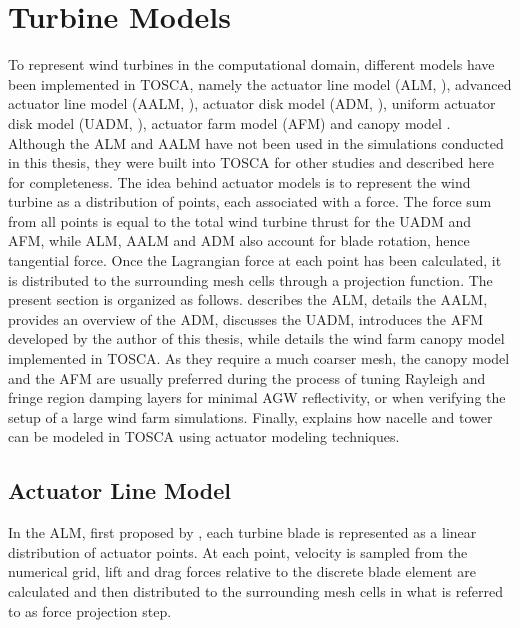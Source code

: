 \section{Turbine Models}
\label{sec:turbineModels}
To represent wind turbines in the computational domain, different models have been implemented in TOSCA, namely the actuator line model (ALM, \citealp{SorensenShen2002,Sorensen2015}), advanced actuator line model (\acrshort{AALM}, \citealp{ChurchfieldEtAl2017}), actuator disk model (\acrshort{ADM}, \citealp{MartinezTossasEtAl2012}), uniform actuator disk model (\acrshort{UADM}, \citealp{PorteAgelEtAl2010,JimenezEtAl2007, JimenezEtAl2008}), actuator farm model (\acrshort{AFM}) and canopy model \citep{LanzilaoMeyers2022a}. Although the ALM and AALM have not been used in the simulations conducted in this thesis, they were built into TOSCA for other studies and described here for completeness. The idea behind actuator models is to represent the wind turbine as a distribution of points, each associated with a force. The force sum from all points is equal to the total wind turbine thrust for the UADM and AFM, while ALM, AALM and ADM also account for blade rotation, hence tangential force. Once the Lagrangian force at each point has been calculated, it is distributed to the surrounding mesh cells through a projection function. The present section is organized as follows.  describes the ALM,  details the AALM,  provides an overview of the ADM,  discusses the UADM,  introduces the AFM developed by the author of this thesis, while  details the wind farm canopy model implemented in TOSCA. As they require a much coarser mesh, the canopy model and the AFM are usually preferred during the process of tuning Rayleigh and fringe region damping layers for minimal AGW reflectivity, or when verifying the setup of a large wind farm simulations. Finally,  explains how nacelle and tower can be modeled in TOSCA using actuator modeling techniques.

\subsection{Actuator Line Model}
\label{subsec:actuatorLineModel}
In the ALM, first proposed by \cite{SorensenShen2002}, each turbine blade is represented as a linear distribution of actuator points. At each point, velocity is sampled from the numerical grid, lift and drag forces relative to the discrete blade element are calculated and then distributed to the surrounding mesh cells in what is referred to as force projection step. 

